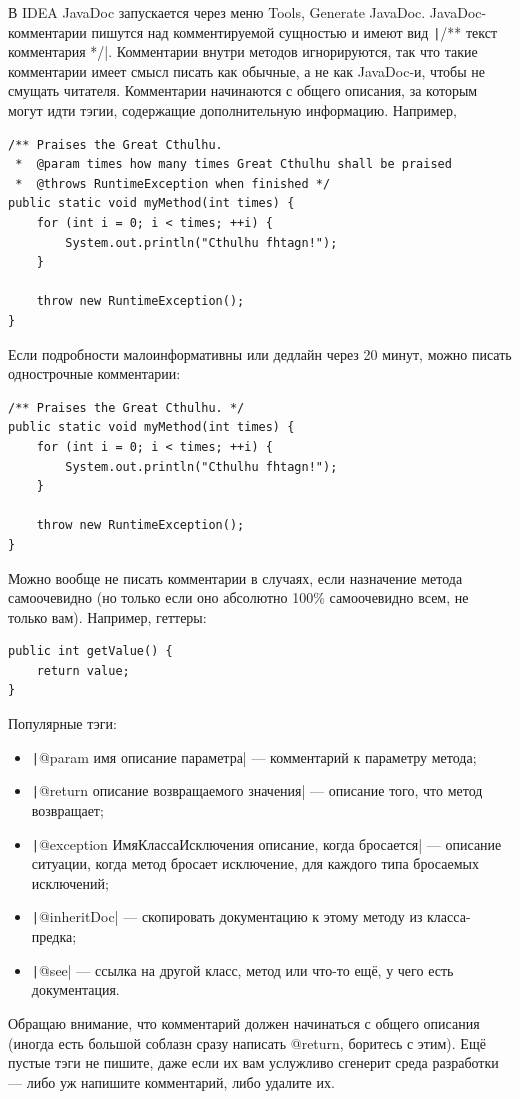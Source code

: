 \documentclass[a5paper]{article}
\begin{document}
В IDEA JavaDoc запускается через меню Tools, Generate JavaDoc. JavaDoc-комментарии пишутся над комментируемой сущностью и имеют вид \texttt|/** текст комментария */|. Комментарии внутри методов игнорируются, так что такие комментарии имеет смысл писать как обычные, а не как JavaDoc-и, чтобы не смущать читателя. Комментарии начинаются с общего описания, за которым могут идти тэгии, содержащие дополнительную информацию. Например,

\begin{verbatim}
/** Praises the Great Cthulhu.
 *  @param times how many times Great Cthulhu shall be praised
 *  @throws RuntimeException when finished */
public static void myMethod(int times) {
    for (int i = 0; i < times; ++i) {
        System.out.println("Cthulhu fhtagn!");
    }

    throw new RuntimeException();
}
\end{verbatim}

Если подробности малоинформативны или дедлайн через 20 минут, можно писать однострочные комментарии:

\begin{verbatim}
/** Praises the Great Cthulhu. */
public static void myMethod(int times) {
    for (int i = 0; i < times; ++i) {
        System.out.println("Cthulhu fhtagn!");
    }

    throw new RuntimeException();
}
\end{verbatim}

Можно вообще не писать комментарии в случаях, если назначение метода самоочевидно (но только если оно абсолютно 100\% самоочевидно всем, не только вам). Например, геттеры:

\begin{verbatim}
public int getValue() {
    return value;
}
\end{verbatim}

Популярные тэги:
\begin{itemize}
	\item \texttt|@param имя описание параметра| --- комментарий к параметру метода;
	\item \texttt|@return описание возвращаемого значения| --- описание того, что метод возвращает;
	\item \texttt|@exception ИмяКлассаИсключения описание, когда бросается| --- описание ситуации, когда метод бросает исключение, для каждого типа бросаемых исключений;
	\item \texttt|{@inheritDoc}| --- скопировать документацию к этому методу из класса-предка;
	\item \texttt|@see| --- ссылка на другой класс, метод или что-то ещё, у чего есть документация.
\end{itemize}

Обращаю внимание, что комментарий должен начинаться с общего описания (иногда есть большой соблазн сразу написать @return, боритесь с этим). Ещё пустые тэги не пишите, даже если их вам услужливо сгенерит среда разработки --- либо уж напишите комментарий, либо удалите их.
\end{document}
